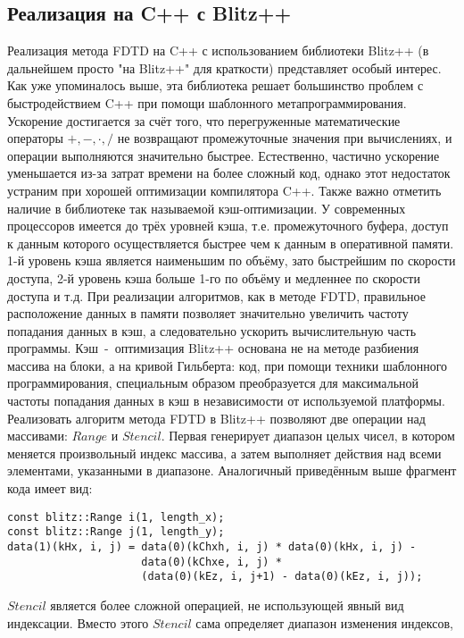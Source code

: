 \documentclass[10pt]{article}
\begin{document}
\subsection{Реализация на C++ с  Blitz++}
Реализация метода FDTD на C++ с использованием библиотеки Blitz++
(в дальнейшем просто "на Blitz++" для краткости) представляет особый интерес.
Как уже упоминалось выше, эта библиотека решает большинство проблем с
быстродействием C++ при помощи шаблонного метапрограммирования. Ускорение
достигается за счёт того, что перегруженные математические операторы 
$+,-,\cdot,/$ не возвращают промежуточные значения при вычислениях, и операции
выполняются значительно быстрее. Естественно, частично ускорение уменьшается 
из-за затрат времени на более сложный код, однако этот недостаток устраним при 
хорошей оптимизации компилятора C++. Также важно отметить наличие в библиотеке 
так называемой кэш-оптимизации. У современных процессоров имеется до трёх
уровней кэша, т.е. промежуточного буфера, доступ к данным которого 
осуществляется быстрее чем к данным в оперативной памяти. 1-й уровень кэша 
является наименьшим по объёму, зато быстрейшим по скорости доступа, 2-й уровень
кэша больше 1-го по объёму и медленнее по скорости доступа и т.д. При реализации
алгоритмов, как в методе FDTD, правильное расположение данных в памяти 
позволяет значительно увеличить частоту попадания данных в кэш, а следовательно
ускорить вычислительную часть программы. Кэш~-~оптимизация Blitz++ основана не
на методе разбиения массива на блоки, а на кривой Гильберта: код, при помощи 
техники шаблонного программирования, специальным образом преобразуется для
максимальной частоты попадания данных в кэш в независимости от используемой
платформы.\\
Реализовать алгоритм метода FDTD в Blitz++ позволяют две операции над массивами:
$Range$ и $Stencil$. Первая генерирует диапазон целых чисел, в котором меняется
произвольный индекс массива, а затем выполняет действия над всеми элементами,
указанными в диапазоне. Аналогичный приведённым выше фрагмент кода имеет вид:\\
\begin{verbatim}
const blitz::Range i(1, length_x);
const blitz::Range j(1, length_y);
data(1)(kHx, i, j) = data(0)(kChxh, i, j) * data(0)(kHx, i, j) -
                     data(0)(kChxe, i, j) *
                     (data(0)(kEz, i, j+1) - data(0)(kEz, i, j));
\end{verbatim}
$Stencil$ является более сложной операцией, не использующей явный вид 
индексации. Вместо этого $Stencil$ сама определяет диапазон изменения индексов,
\end{document}
